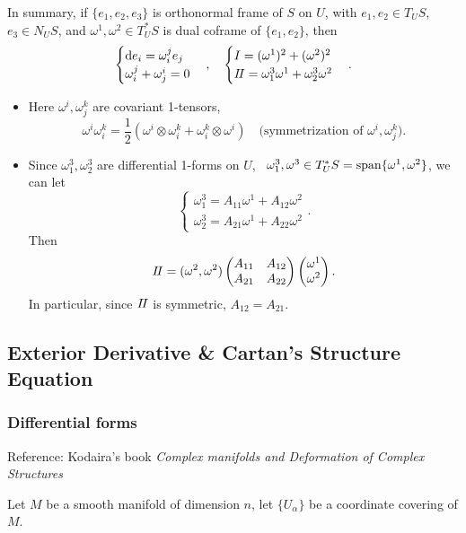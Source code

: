 In summary, if \(\{e_1,e_2,e_3\}\) is orthonormal frame of \(S\) on \(U\), with
\(e_1,e_2\in T_U S\), \(e_3\in N_U S\), and \(\omega^1,\omega^2\in T_U^*S\) is
dual coframe of \(\{e_1,e_2\}\), then \[
    \begin{cases}
        \dd{e_i}=\omega_i^je_j \\
        \omega_i^j+\omega_j^i=0
    \end{cases},\quad \begin{cases}
        I=(\omega^1)^2+(\omega^2)^2 \\
        I\!I=\omega_1^3\omega^1+\omega_2^3\omega^2
    \end{cases}
.\] 
\begin{remark}\hfill
\begin{itemize}
\item Here \(\omega^i,\omega_j^k\) are covariant 1-tensors, \[
    \omega^i\omega_i^k=\frac{1}{2}(\omega^i\otimes\omega_i^k+\omega_i^k\otimes\omega^i)
    \quad \text{(symmetrization of }\omega^i,\omega_j^k\text{)}
.\] 
\item Since \(\omega_1^3,\omega_2^3\) are differential 1-forms on \(U\), \ie\ \(
    \omega_1^3,\omega^3\in T_U^*S=\operatorname{span}\{\omega^1,\omega^2\}\), we can let \[
        \begin{cases}
            \omega_1^3=A_{11}\omega^1+A_{12}\omega^2 \\
            \omega_2^3=A_{21}\omega^1+A_{22}\omega^2
        \end{cases}
    .\] Then \[
        I\!I=(\omega^2,\omega^2)\begin{pmatrix}
            A_{11} & A_{12} \\
            A_{21} & A_{22}
        \end{pmatrix}\begin{pmatrix}
            \omega^1 \\ \omega^2
        \end{pmatrix}
    .\] In particular, since \(I\!I\) is symmetric, \(A_{12}=A_{21}\).
\end{itemize}

\subsection{Exterior Derivative \& Cartan's Structure Equation}
\subsubsection{Differential forms}
Reference: Kodaira's book \emph{Complex manifolds and Deformation of Complex Structures}

Let \(M\) be a smooth manifold of dimension \(n\), let \(\{U_\alpha\}\) be a coordinate covering of \(M\).




\end{remark}
